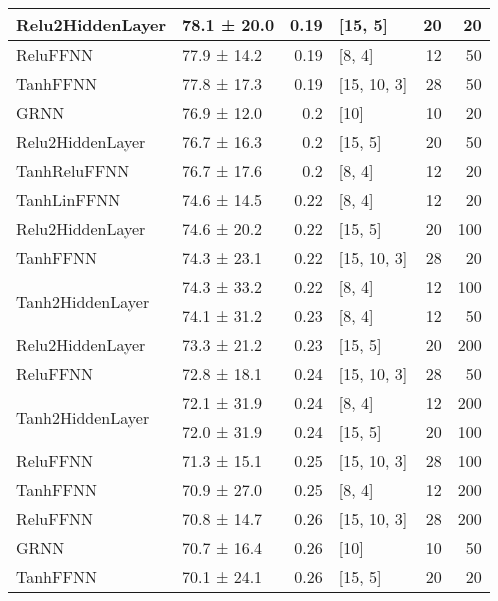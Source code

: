 \begin{longtable}{llrlrr}
 \hline
Relu2HiddenLayer         & 78.1 ± 20.0 &  0.19 & [15, 5]        &         20 &       20 \\
 \hline
ReluFFNN         & 77.9 ± 14.2 &  0.19 & [8, 4]         &         12 &       50 \\
 \hline
TanhFFNN         & 77.8 ± 17.3 &  0.19 & [15, 10, 3]    &         28 &       50 \\
 \hline
GRNN         & 76.9 ± 12.0 &  0.2  & [10]           &         10 &       20 \\
 \hline
Relu2HiddenLayer         & 76.7 ± 16.3 &  0.2  & [15, 5]        &         20 &       50 \\
 \hline
TanhReluFFNN         & 76.7 ± 17.6 &  0.2  & [8, 4]         &         12 &       20 \\
 \hline
TanhLinFFNN         & 74.6 ± 14.5 &  0.22 & [8, 4]         &         12 &       20 \\
 \hline
Relu2HiddenLayer         & 74.6 ± 20.2 &  0.22 & [15, 5]        &         20 &      100 \\
 \hline
TanhFFNN         & 74.3 ± 23.1 &  0.22 & [15, 10, 3]    &         28 &       20 \\
 \hline
\multirow{2}{*}{Tanh2HiddenLayer}         & 74.3 ± 33.2 &  0.22 & [8, 4]         &         12 &      100 \\
         & 74.1 ± 31.2 &  0.23 & [8, 4]         &         12 &       50 \\
 \hline
Relu2HiddenLayer         & 73.3 ± 21.2 &  0.23 & [15, 5]        &         20 &      200 \\
 \hline
ReluFFNN         & 72.8 ± 18.1 &  0.24 & [15, 10, 3]    &         28 &       50 \\
 \hline
\multirow{2}{*}{Tanh2HiddenLayer}         & 72.1 ± 31.9 &  0.24 & [8, 4]         &         12 &      200 \\
         & 72.0 ± 31.9 &  0.24 & [15, 5]        &         20 &      100 \\
 \hline
ReluFFNN         & 71.3 ± 15.1 &  0.25 & [15, 10, 3]    &         28 &      100 \\
 \hline
TanhFFNN         & 70.9 ± 27.0 &  0.25 & [8, 4]         &         12 &      200 \\
 \hline
ReluFFNN         & 70.8 ± 14.7 &  0.26 & [15, 10, 3]    &         28 &      200 \\
 \hline
GRNN         & 70.7 ± 16.4 &  0.26 & [10]           &         10 &       50 \\
 \hline
TanhFFNN         & 70.1 ± 24.1 &  0.26 & [15, 5]        &         20 &       20 \\

\end{longtable}
